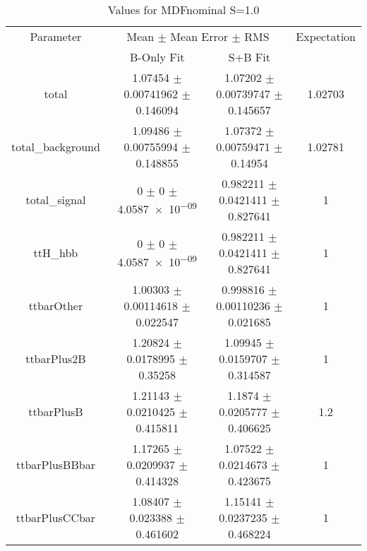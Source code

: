 \begin{table}
\centering
\caption{Values for MDFnominal S=1.0}
\begin{tabular}{cccc}
\toprule
Parameter & \multicolumn{2}{c}{Mean $\pm$ Mean Error $\pm$ RMS} & Expectation\\
 & B-Only Fit & S+B Fit & \\
\midrule
total & \num{1.07454} $\pm$ \num{0.00741962} $\pm$ \num{0.146094} & \num{1.07202} $\pm$ \num{0.00739747} $\pm$ \num{0.145657} & \num{1.02703}\\
total\_background & \num{1.09486} $\pm$ \num{0.00755994} $\pm$ \num{0.148855} & \num{1.07372} $\pm$ \num{0.00759471} $\pm$ \num{0.14954} & \num{1.02781}\\
total\_signal & \num{0} $\pm$ \num{0} $\pm$ \num{4.0587e-09} & \num{0.982211} $\pm$ \num{0.0421411} $\pm$ \num{0.827641} & \num{1}\\
ttH\_hbb & \num{0} $\pm$ \num{0} $\pm$ \num{4.0587e-09} & \num{0.982211} $\pm$ \num{0.0421411} $\pm$ \num{0.827641} & \num{1}\\
ttbarOther & \num{1.00303} $\pm$ \num{0.00114618} $\pm$ \num{0.022547} & \num{0.998816} $\pm$ \num{0.00110236} $\pm$ \num{0.021685} & \num{1}\\
ttbarPlus2B & \num{1.20824} $\pm$ \num{0.0178995} $\pm$ \num{0.35258} & \num{1.09945} $\pm$ \num{0.0159707} $\pm$ \num{0.314587} & \num{1}\\
ttbarPlusB & \num{1.21143} $\pm$ \num{0.0210425} $\pm$ \num{0.415811} & \num{1.1874} $\pm$ \num{0.0205777} $\pm$ \num{0.406625} & \num{1.2}\\
ttbarPlusBBbar & \num{1.17265} $\pm$ \num{0.0209937} $\pm$ \num{0.414328} & \num{1.07522} $\pm$ \num{0.0214673} $\pm$ \num{0.423675} & \num{1}\\
ttbarPlusCCbar & \num{1.08407} $\pm$ \num{0.023388} $\pm$ \num{0.461602} & \num{1.15141} $\pm$ \num{0.0237235} $\pm$ \num{0.468224} & \num{1}\\
\bottomrule
\end{tabular}
\end{table}